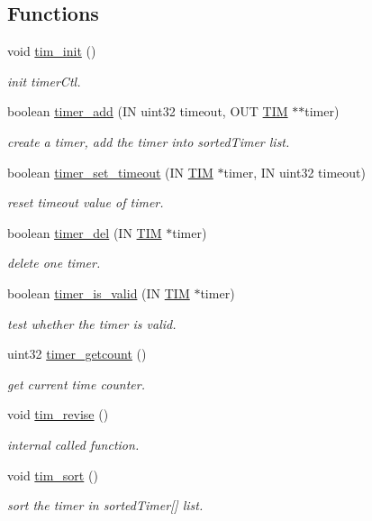 \subsection*{Functions}
\begin{DoxyCompactItemize}
\item 
void \hyperlink{group__tim_ga7624bf709371205b24452df8ca316ab2}{tim\+\_\+init} ()
\begin{DoxyCompactList}\small\item\em init timer\+Ctl. \end{DoxyCompactList}\item 
boolean \hyperlink{group__tim_gad08548924a886c19bed954663f37a63f}{timer\+\_\+add} (I\+N uint32 timeout, O\+U\+T \hyperlink{struct_t_i_m}{T\+I\+M} $\ast$$\ast$timer)
\begin{DoxyCompactList}\small\item\em create a timer, add the timer into sorted\+Timer list. \end{DoxyCompactList}\item 
boolean \hyperlink{group__tim_gacc23aa4ba2de1eb3a33370bee74080ad}{timer\+\_\+set\+\_\+timeout} (I\+N \hyperlink{struct_t_i_m}{T\+I\+M} $\ast$timer, I\+N uint32 timeout)
\begin{DoxyCompactList}\small\item\em reset timeout value of timer. \end{DoxyCompactList}\item 
boolean \hyperlink{group__tim_ga9eae53f097274f823e918123904397a4}{timer\+\_\+del} (I\+N \hyperlink{struct_t_i_m}{T\+I\+M} $\ast$timer)
\begin{DoxyCompactList}\small\item\em delete one timer. \end{DoxyCompactList}\item 
boolean \hyperlink{group__tim_ga0d1983206eda05d809414ba0a3c0b539}{timer\+\_\+is\+\_\+valid} (I\+N \hyperlink{struct_t_i_m}{T\+I\+M} $\ast$timer)
\begin{DoxyCompactList}\small\item\em test whether the timer is valid. \end{DoxyCompactList}\item 
uint32 \hyperlink{group__tim_ga4c60fc359f9528c3a6a83c00f6931f65}{timer\+\_\+getcount} ()
\begin{DoxyCompactList}\small\item\em get current time counter. \end{DoxyCompactList}\item 
void \hyperlink{group__tim_gad52b255bc6d45dd3da0df719cd58ef4c}{tim\+\_\+revise} ()
\begin{DoxyCompactList}\small\item\em internal called function. \end{DoxyCompactList}\item 
void \hyperlink{group__tim_ga0962091b087a076d07dbd0f2de6100f4}{tim\+\_\+sort} ()
\begin{DoxyCompactList}\small\item\em sort the timer in sorted\+Timer\mbox{[}\mbox{]} list. \end{DoxyCompactList}\end{DoxyCompactItemize}
